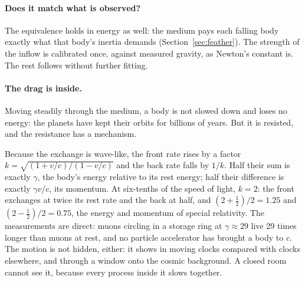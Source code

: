 \paragraph{Does it match what is observed?}  The equivalence holds in energy as well: the medium pays each falling body exactly what that body's inertia demands (Section~\ref{sec:feather}). The strength of the inflow is calibrated once, against measured gravity, as Newton's constant is. The rest follows without further fitting.

\paragraph{The drag is inside.} Moving steadily through the medium, a body is not slowed down and loses no energy: the planets have kept their orbits for billions of years. But it is resisted, and the resistance has a mechanism. 

Because the exchange is wave-like, the front rate rises by a factor $k=\sqrt{(1+v/c)/(1-v/c)}$ and the back rate falls by $1/k$. Half their sum is exactly $\gamma$, the body's energy relative to its rest energy; half their difference is exactly $\gamma v/c$, its momentum. At six-tenths of the speed of light, $k=2$: the front exchanges at twice its rest rate and the back at half, and $(2+\tfrac12)/2 = 1.25$ and $(2-\tfrac12)/2 = 0.75$, the energy and momentum of special relativity.   The measurements are direct: muons circling in a storage ring at $\gamma \approx 29$ live 29 times longer than muons at rest, and no particle accelerator has brought a body to $c$. The motion is not hidden, either: it shows in moving clocks compared with clocks elsewhere, and through a window onto the cosmic background. A closed room cannot see it, because every process inside it slows together.

